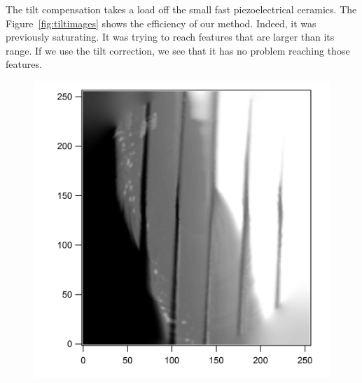 The tilt compensation takes a load off the small fast piezoelectrical ceramics. The Figure~\ref{fig:tiltimages}  shows the efficiency of our method. Indeed, it was previously saturating. It was trying to reach features that are larger than its range. If we use the tilt correction, we see that it has no problem reaching those features.

\begin{figure}[ht]
\begin{minipage}[b]{0.45\linewidth}
\centering
\includegraphics[width=\textwidth]{images/TiltSession0226_27.png}


\end{minipage}
\end{figure}
